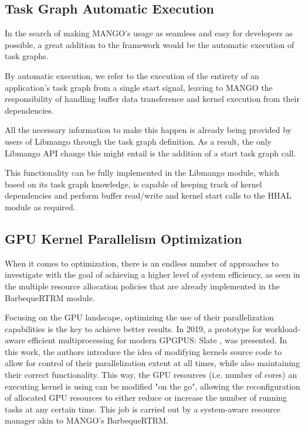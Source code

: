 \subsection{Task Graph Automatic Execution}

In the search of making MANGO's usage as seamless and easy for developers as possible, a great addition to the framework would be the automatic execution of task graphs. 

By automatic execution, we refer to the execution of the entirety of an application's task graph from a single start signal, leaving to MANGO the responsibility of handling buffer data transference and kernel execution from their dependencies.

All the necessary information to make this happen is already being provided by users of Libmango through the task graph definition. As a result, the only Libmango API change this might entail is the addition of a start task graph call.

This functionality can be fully implemented in the Libmango module, which based on its task graph knowledge, is capable of keeping track of kernel dependencies and perform buffer read/write and kernel start calls to the HHAL module as required.

\subsection{GPU Kernel Parallelism Optimization}

When it comes to optimization, there is an endless number of approaches to investigate with the goal of achieving a higher level of system efficiency, as seen in the multiple resource allocation policies that are already implemented in the BarbequeRTRM module.

Focusing on the GPU landscape, optimizing the use of their parallelization capabilities is the key to achieve better results. In 2019, a prototype for workload-aware efficient multiprocessing for modern GPGPUS: Slate \cite{slate}, was presented.
In this work, the authors introduce the idea of modifying kernels source code to allow for control of their parallelization extent at all times, while also maintaining their correct functionality. This way, the GPU resources (i.e. number of cores) an executing kernel is using can be modified "on the go", allowing the reconfiguration of allocated GPU resources to either reduce or increase the number of running tasks at any certain time. This job is carried out by a system-aware resource manager akin to MANGO's BarbequeRTRM.

